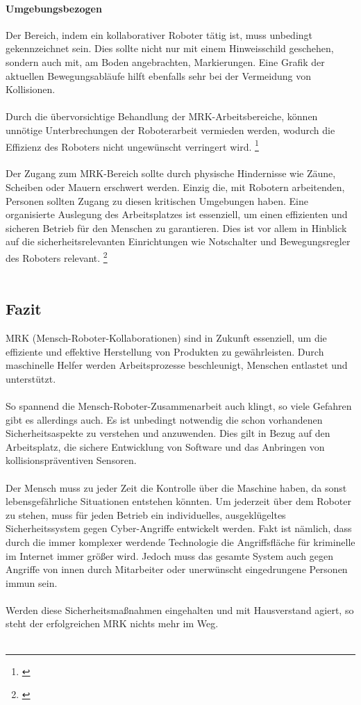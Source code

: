 \documentclass[titlepage,12pt,twoside]{article}
\begin{document}
\paragraph{Umgebungsbezogen}
\hfill \break
\hfill \break
Der Bereich, indem ein kollaborativer Roboter tätig ist, muss unbedingt 
gekennzeichnet sein. Dies sollte nicht nur mit einem Hinweisschild geschehen, 
sondern auch mit, am Boden angebrachten, Markierungen. Eine Grafik der aktuellen 
Bewegungsabläufe hilft ebenfalls sehr bei der Vermeidung von Kollisionen. \\
\\
Durch die übervorsichtige Behandlung der MRK-Arbeitsbereiche, können unnötige 
Unterbrechungen der Roboterarbeit vermieden werden, wodurch die Effizienz des 
Roboters nicht ungewünscht verringert wird. \footnote{\cite{Frauenhofer23}} \\
\\
Der Zugang zum MRK-Bereich sollte durch physische Hindernisse wie Zäune, Scheiben 
oder Mauern erschwert werden. Einzig die, mit Robotern arbeitenden, Personen 
sollten Zugang zu diesen kritischen Umgebungen haben. Eine organisierte Auslegung 
des Arbeitsplatzes ist essenziell, um einen effizienten und sicheren Betrieb für 
den Menschen zu garantieren. Dies ist vor allem in Hinblick auf die 
sicherheitsrelevanten Einrichtungen wie Notschalter und Bewegungsregler des 
Roboters relevant. \footnote{\cite{Frauenhofer23}} \\
\\
\subsection{Fazit}
MRK (Mensch-Roboter-Kollaborationen) sind in Zukunft essenziell, um die effiziente 
und effektive Herstellung von Produkten zu gewährleisten. Durch maschinelle 
Helfer werden Arbeitsprozesse beschleunigt, Menschen entlastet und unterstützt. \\
\\
So spannend die Mensch-Roboter-Zusammenarbeit auch klingt, so viele Gefahren gibt 
es allerdings auch. Es ist unbedingt notwendig die schon vorhandenen 
Sicherheitsaspekte zu verstehen und anzuwenden. Dies gilt in Bezug auf den 
Arbeitsplatz, die sichere Entwicklung von Software und das Anbringen von 
kollisionspräventiven Sensoren. \\
\\
Der Mensch muss zu jeder Zeit die Kontrolle über die Maschine haben, da sonst 
lebensgefährliche Situationen entstehen könnten. Um jederzeit über dem Roboter 
zu stehen, muss für jeden Betrieb ein individuelles, ausgeklügeltes 
Sicherheitssystem gegen Cyber-Angriffe entwickelt werden. Fakt ist nämlich, dass 
durch die immer komplexer werdende Technologie die Angriffsfläche für kriminelle 
im Internet immer größer wird. Jedoch muss das gesamte System auch gegen Angriffe 
von innen durch Mitarbeiter oder unerwünscht eingedrungene Personen immun sein. \\
\\
Werden diese Sicherheitsmaßnahmen eingehalten und mit Hausverstand agiert, so 
steht der erfolgreichen MRK nichts mehr im Weg. \\
\\
\end{document}
